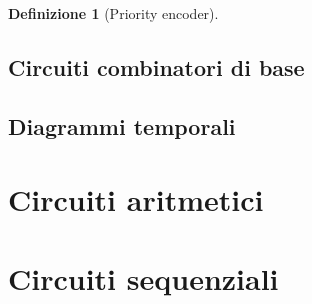 \documentclass[a4paper,12pt]{article}
\theoremstyle{mystyle}
\newtheorem{definition}[theorem]{Definizione}
\begin{document}
\begin{definition}[Priority encoder]
    
\end{definition}

\subsection{Circuiti combinatori di base}

\subsection{Diagrammi temporali}

\section{Circuiti aritmetici}

\section{Circuiti sequenziali}
\end{document}
